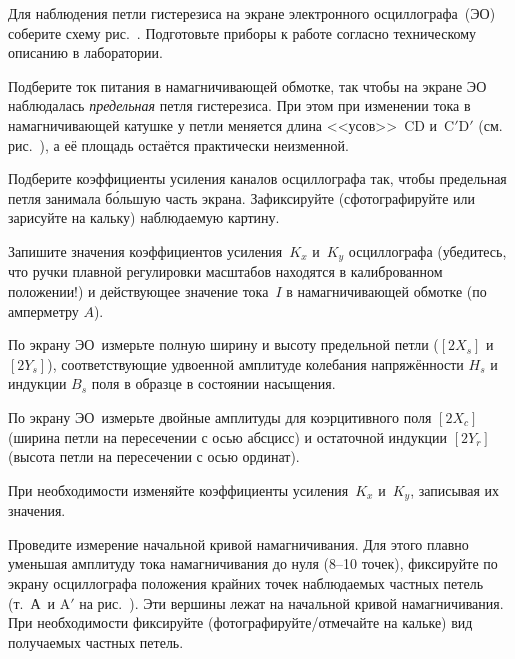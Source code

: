 \begin{lab:task}



\item
Для наблюдения петли гистерезиса на экране электронного осциллографа~(ЭО)
соберите схему рис.~. 
Подготовьте приборы к работе согласно техническому описанию в лаборатории.

\item \label{p45-1}
Подберите ток питания в намагничивающей обмотке, так чтобы на экране ЭО
наблюдалась \emph{предельная} петля гистерезиса. При этом 
при изменении тока в намагничивающей катушке 
у петли меняется длина <<усов>>~CD 
и~C$'$D$'$ (см. рис.~), а её площадь остаётся
практически неизменной.

\item Подберите коэффициенты усиления каналов осциллографа так, 
чтобы предельная петля занимала б\'{о}льшую часть экрана.
Зафиксируйте (сфотографируйте или зарисуйте на кальку)
наблюдаемую картину.

Запишите значения коэффициентов усиления~$K_x$ и~$K_y$ осциллографа 
(убедитесь, что ручки плавной регулировки масштабов находятся
в калиброванном положении!) и действующее значение тока~$I$ 
в намагничивающей обмотке (по амперметру $A$).

\item \label{p45-2} По экрану ЭО~измерьте полную ширину и высоту
предельной петли ($[2X_{s}]$ и $[2Y_{s}]$),
соответствующие удвоенной амплитуде колебания 
напряжённости $H_s$ и индукции $B_s$ поля в образце в состоянии насыщения.

\item \label{p45-3} По экрану ЭО~измерьте двойные амплитуды 
для коэрцитивного поля $[2X_c]$ (ширина петли на пересечении с осью абсцисс) и
остаточной индукции $[2Y_r]$ (высота петли на пересечении с осью ординат).

При необходимости изменяйте коэффициенты усиления~$K_x$ и~$K_y$,
записывая их значения.

\item 
Проведите измерение начальной кривой намагничивания. 
Для этого плавно уменьшая амплитуду тока
намагничивания до нуля (8--10 точек), фиксируйте
по экрану осциллографа положения крайних точек наблюдаемых частных петель
(т.~А~и A$'$ на рис.~).
Эти вершины лежат на начальной кривой намагничи­вания.
При необходимости фиксируйте (фотографируйте/отмечайте на кальке)
вид получаемых частных петель.


\end{lab:task}

